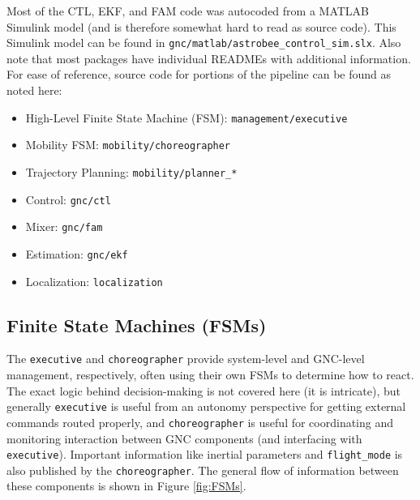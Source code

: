 \documentclass{article}
\begin{document}
Most of the CTL, EKF, and FAM code was autocoded from a MATLAB Simulink model (and is therefore somewhat hard to read as source code). This Simulink model can be found in \texttt{gnc/matlab/astrobee\_control\_sim.slx}. Also note that most packages have individual READMEs with additional information. For ease of reference, source code for portions of the pipeline can be found as noted here:

\begin{itemize}
 	\item High-Level Finite State Machine (FSM): \texttt{management/executive}
	\item Mobility FSM: \texttt{mobility/choreographer}
    \item Trajectory Planning: \texttt{mobility/planner\_*}
    \item Control: \texttt{gnc/ctl}
    \item Mixer: \texttt{gnc/fam}
    \item Estimation:  \texttt{gnc/ekf}
    \item Localization: \texttt{localization}
\end{itemize}


\subsection{Finite State Machines (FSMs)}

The \texttt{executive} and \texttt{choreographer} provide system-level and GNC-level management, respectively, often using their own FSMs to determine how to react. The exact logic behind decision-making is not covered here (it is intricate), but generally \texttt{executive} is useful from an autonomy perspective for getting external commands routed properly, and \texttt{choreographer} is useful for coordinating and monitoring interaction between GNC components (and interfacing with \texttt{executive}). Important information like inertial parameters and \texttt{flight\_mode} is also published by the \texttt{choreographer}. The general flow of information between these components is shown in Figure \ref{fig:FSMs}.
\end{document}
